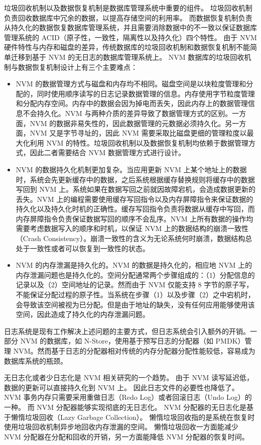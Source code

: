 垃圾回收机制以及数据恢复机制是数据库管理系统中重要的组件。
垃圾回收机制负责回收数据库中冗余的数据，以提高存储空间的利用率。
而数据恢复机制负责从持久化的数据恢复数据库管理系统，并且需要消除数据中的不一致以保证数据库管理系统的 ACID（原子性，一致性，隔离性以及持久化）四个特性。
由于 NVM 硬件特性与内存和磁盘的差异，传统数据库的垃圾回收机制和数据恢复机制不能简单迁移到基于 NVM 的无日志的数据库管理系统上。
NVM 数据库的垃圾回收机制与数据恢复机制设计上有三个主要难点：
\begin{itemize}
    \item NVM 的数据管理方式与磁盘和内存均不相同。磁盘空间是以块粒度管理和分配的，同时使用顺序读写的日志记录数据管理的信息。内存使用字节粒度管理和分配内存空间。内存中的数据会因为掉电而丢失，因此内存上的数据管理信息不会持久化。NVM 与两种介质的差异导致了数据管理方式的区别。一方面，NVM 的数据非易失性的，因此数据管理的元数据必须持久化。另一方面，NVM 又是字节寻址的，因此 NVM 需要采取比磁盘更细的管理粒度以最大化利用 NVM 的特性。垃圾回收机制以及数据恢复机制均依赖于数据管理方式，因此二者需要结合 NVM 数据管理方式进行设计。
    \item NVM 的数据持久化机制更加复杂。当应用更新 NVM 上某个地址上的数据时，系统会先更新缓存中的数据，之后系统根据缓存替换规则将缓存中的数据写回到 NVM 上。系统如果在数据写回之前就因故障宕机，会造成数据更新的丢失。NVM 上的编程需要使用缓存写回指令以及内存屏障指令来保证数据的持久化以及持久化时机的正确性。缓存写回指令负责将数据从缓存中写回，而内存屏障指令负责保证数据写回的顺序不会乱序。NVM 上所有数据的操作均需要考虑数据写入的顺序和时机，以保证 NVM 上的数据结构的崩溃一致性（Crash Consistency）。崩溃一致性的含义为无论系统何时崩溃，数据结构总处于一致性或者可以恢复到一致性的状态。
    \item NVM 的内存泄漏是持久化的。NVM 的数据是持久化的，相应地 NVM 上的内存泄漏问题也是持久化的。空间分配通常两个步骤组成的：（1）分配信息的记录以及（2）空间地址的记录。然而由于 NVM 仅能支持 8 字节的原子写，不能保证分配过程的原子性。当系统在步骤（1）以及步骤（2）之中宕机时，会导致该空间被视为已分配。但是由于地址的缺失，没有任何应用能够使用该空间，因此造成了持久化的内存泄漏问题。

\end{itemize}

日志系统是现有工作解决上述问题的主要方式，但日志系统会引入额外的开销。一部分 NVM 的数据库，如 N-Store，使用基于预写日志的分配器（如 PMDK\cite{pmdk}）管理 NVM。然而基于日志的分配器相对传统的内存分配器分配性能较低，容易成为数据库系统的瓶颈。

无日志化或者少日志化是 NVM 相关研究的一个趋势。
由于 NVM 读写延迟低，数据的更新可以直接持久化到 NVM 上。
因此日志文件的必要性也降低了。
NVM 事务内存只需要采用重做日志（Redo Log）或者回滚日志（Undo Log）的一种。
而 NVM 分配器能够实现彻底的无日志化。
NVM 分配器的无日志化是基于懒惰垃圾回收（Lazy Garbage Collection）\cite{bhandari_makalu_2016}。
懒惰垃圾回收指的是系统在恢复时使用垃圾回收机制异步地回收内存泄漏的空间。
懒惰垃圾回收一方面能减少 NVM 分配器在分配和回收的开销，另一方面能降低 NVM 分配器的恢复时间。



